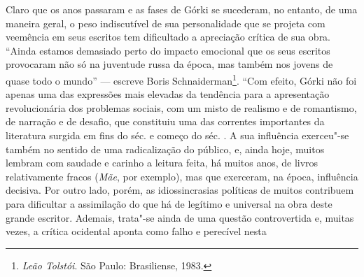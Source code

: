 Claro que os anos passaram e as fases de Górki se sucederam, no entanto,
de uma maneira geral, o peso indiscutível de sua personalidade que se
projeta com veemência em seus escritos tem dificultado a apreciação
crítica de sua obra. ``Ainda estamos demasiado perto do impacto
emocional que os seus escritos provocaram não só na juventude russa da
época, mas também nos jovens de quase todo o mundo'' --- escreve Boris
Schnaiderman\footnote{\emph{Leão Tolstói}. São Paulo: Brasiliense, 1983.}. ``Com efeito, Górki não foi apenas uma das expressões
mais elevadas da tendência para a apresentação revolucionária dos
problemas sociais, com um misto de realismo e de romantismo, de narração
e de desafio, que constituiu uma das correntes importantes da literatura
surgida em fins do séc.  e começo do séc. . A sua influência
exerceu"-se também no sentido de uma radicalização do público, e, ainda
hoje, muitos lembram com saudade e carinho a leitura feita, há muitos
anos, de livros relativamente fracos (\emph{Mãe}, por exemplo), mas que
exerceram, na época, influência decisiva. Por outro lado, porém, as
idiossincrasias políticas de muitos contribuem para dificultar a
assimilação do que há de legítimo e universal na obra deste grande
escritor. Ademais, trata"-se ainda de uma questão controvertida e,
muitas vezes, a crítica ocidental aponta como falho e perecível nesta
